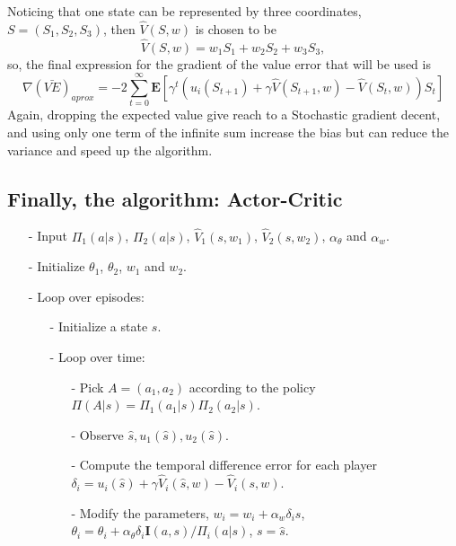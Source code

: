 \documentclass{article}
\begin{document}
Noticing that one state can be represented by three coordinates, $S = (S_1,S_2,S_3)$, then $\hat{V}(S,w)$ is chosen to be 
\begin{equation}
    \hat{V}(S,w) = w_1S_1 + w_2S_2 + w_3S_3,
\end{equation}
so, the final expression for the gradient of the value error that will be used is
\begin{equation}
    \nabla (\bar{VE})_{aprox}=-2\sum_{t=0}^\infty \mathbf{E}[\gamma^t(u_i(S_{t+1}) +\gamma \hat{V}(S_{t+1},w) - \hat{V}(S_t,w))S_t]
\end{equation}
Again, dropping the expected value give reach to a Stochastic gradient decent, and using only one term of the infinite sum increase the bias but can reduce the variance and speed up the algorithm. 

\subsection*{Finally, the algorithm: Actor-Critic}
\begin{itemize}
    \item[-] Input $\Pi_1(a|s)$, $\Pi_2(a|s)$, $\hat{V}_1(s,w_1)$, $\hat{V}_2(s,w_2)$, $\alpha_\theta$ and $\alpha_w$.
    \item[-] Initialize $\theta_1$, $\theta_2$, $w_1$ and $w_2$.
    \item[-] Loop over episodes:
    \begin{itemize}
        \item[-] Initialize a state $s$.
        \item[-] Loop over time:
        \begin{itemize}
            \item[-] Pick $A=(a_1,a_2)$ according to the policy $\Pi(A|s) = \Pi_1(a_1|s)\Pi_2(a_2|s)$.
            \item[-] Observe $\hat{s},u_1(\hat{s}),u_2(\hat{s}) $.
            \item[-] Compute the temporal difference error for each player $\delta_i = u_i(\hat{s}) + \gamma \hat{V}_i(\hat{s},w) - \hat{V}_i(s,w) $.
            \item[-] Modify the parameters, $w_i=w_i+\alpha_w \delta_i s $, $\theta_i = \theta_i + \alpha_\theta \delta_i \mathbf{I}(a,s)/\Pi_i(a|s)$, $s = \hat{s}$.
            
        \end{itemize}
    \end{itemize}
    
\end{itemize}

\printbibliography
\end{document}
